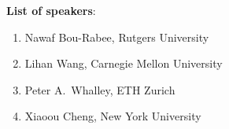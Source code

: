 \begin{talk}
\medskip
\textbf{List of speakers}: 
\begin{enumerate}
    \item Nawaf Bou-Rabee, Rutgers University 
    \item Lihan Wang, Carnegie Mellon University
    \item Peter A.~Whalley, ETH Zurich
    \item Xiaoou Cheng, New York University
\end{enumerate}



  
\end{talk}

